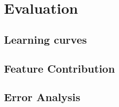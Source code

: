 \chapter{Evaluation}
\label{sec:Evaluation}

\section{Learning curves}

\section{Feature Contribution}

\section{Error Analysis}
